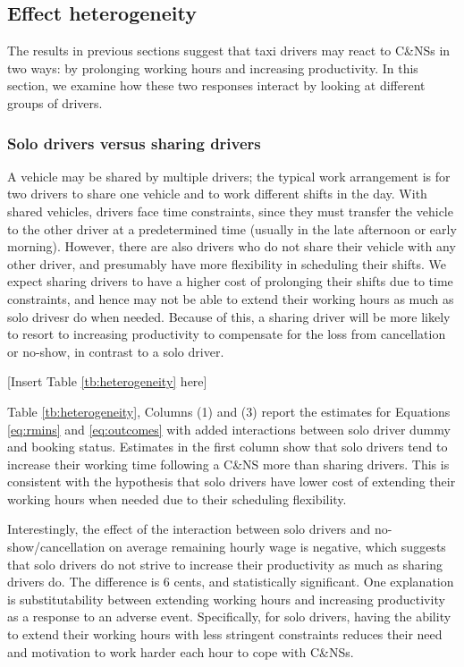 \documentclass[reviewmode]{AEA}
\begin{document}
\subsection{Effect heterogeneity}

The results in previous sections suggest that taxi drivers may react to C\&NSs in two ways: by prolonging working hours and increasing productivity. In this section, we examine how these two responses interact by looking at different groups of drivers.

\subsubsection{Solo drivers versus sharing drivers}

A vehicle may be shared by multiple drivers; the typical work arrangement is for two drivers to share one vehicle and to work different shifts in the day. With shared vehicles, drivers face time constraints, since they must transfer the vehicle to the other driver at a predetermined time (usually in the late afternoon or early morning). However, there are also drivers who do not share their vehicle with any other driver, and presumably have more flexibility in scheduling their shifts.
We expect sharing drivers to have a higher cost of prolonging their shifts due to time constraints, and hence may not be able to extend their working hours as much as solo drivesr do when needed. Because of this, a sharing driver will be more likely to resort to increasing productivity to compensate for the loss from cancellation or no-show, in contrast to a solo driver.

\begin{center}
	[Insert Table \ref{tb:heterogeneity} here]
\end{center}

Table \ref{tb:heterogeneity}, Columns (1) and (3) report the estimates for Equations \eqref{eq:rmins} and \eqref{eq:outcomes} with added interactions between solo driver dummy and booking status. Estimates in the first column show that solo drivers tend to increase their working time following a C\&NS more than sharing drivers. This is consistent with the hypothesis that solo drivers have lower cost of extending their working hours when needed due to their scheduling flexibility.

Interestingly, the effect of the interaction between solo drivers and no-show/cancellation on average remaining hourly wage is negative, which suggests that solo drivers do not strive to increase their productivity as much as sharing drivers do. The difference is 6 cents, and statistically significant. One explanation is substitutability between extending working hours and increasing productivity as a response to an adverse event. Specifically, for solo drivers, having the ability to extend their working hours with less stringent constraints reduces their need and motivation to work harder each hour to cope with C\&NSs.
\end{document}
